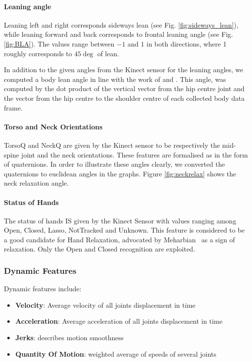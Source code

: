 \documentclass[a4paper,twocolumn]{svjour3}
\begin{document}
\paragraph{Leaning angle}
Leaning left and right corresponds sideways lean (see Fig. \ref{fig:sideways_lean}), while leaning forward and back corresponds to frontal leaning angle (see Fig. \ref{fig:BLA}). 
The values range between $-1$ and $1$ in both directions, where 1 roughly corresponds to $45\deg$ of lean.

In addition to the given angles from the Kinect sensor for the leaning angles, we computed a body lean angle in line with the work of \cite{Castellano2009} and \cite{Schegloff}. This angle, was computed by the dot product of the vertical vector from the hip centre joint and the vector from the hip centre to the shoulder centre of each collected body data frame. 

\paragraph{Torso and Neck Orientations}
TorsoQ and NeckQ are given by the Kinect sensor to be respectively the mid-spine joint and the neck orientations. 
These features are formalised as in the form of quaternions. 
In order to illustrate  these angles clearly, we converted the quaternions to euclidean angles in the graphs.
Figure \ref{fig:neckrelax} shows the neck relaxation angle.


\paragraph{Status of Hands}
The status of hands IS given by the Kinect Sensor with values ranging among Open, Closed, Lasso, NotTracked and Unknown. 
This feature is considered to be a good candidate for Hand Relaxation, advocated by Meharbian~\cite{Mehrabian1968} as a sign of relaxation. 
Only the Open and Closed recognition are exploited. 

\subsubsection{Dynamic Features}
Dynamic features include:
\begin{itemize}[noitemsep,nolistsep]
\item \textbf{Velocity}: Average velocity of all joints displacement in time
\item \textbf{Acceleration}: Average acceleration of all joints displacement in time 
\item \textbf{Jerks}: describes motion smoothness
\item \textbf{Quantity Of Motion}: weighted average of speeds of several joints
\end{itemize}
\end{document}
